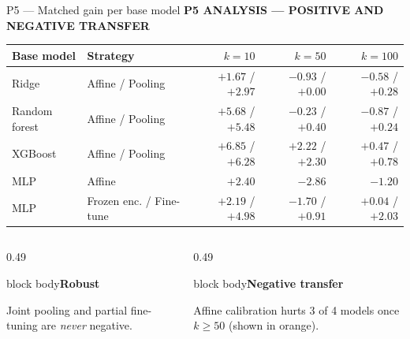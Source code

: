 \documentclass[aspectratio=169,11pt]{beamer}
\newcommand{\sectiontag}[1]{{\footnotesize\usebeamercolor[fg]{structure}\textbf{#1}}\par\vspace{0.10cm}}
\newcommand{\factbox}[2]{\begin{beamercolorbox}[sep=0.13cm,wd=\linewidth]{block body}{\bfseries #1}\par\small #2\end{beamercolorbox}}
\begin{document}
\begin{frame}{P5 — Matched gain per base model}
\sectiontag{P5 \quad ANALYSIS — POSITIVE AND NEGATIVE TRANSFER}
{\footnotesize
\setlength{\tabcolsep}{6pt}
\renewcommand{\arraystretch}{1.22}
\begin{tabular}{@{}llrrr@{}}\toprule
\textbf{Base model} & \textbf{Strategy} & \textbf{$k=10$} & \textbf{$k=50$} & \textbf{$k=100$}\\\midrule
Ridge & Affine / Pooling & $+1.67$ / $+2.97$ & \textcolor{warn}{$-0.93$} / $+0.00$ & \textcolor{warn}{$-0.58$} / $+0.28$\\
Random forest & Affine / Pooling & $+5.68$ / $+5.48$ & \textcolor{warn}{$-0.23$} / $+0.40$ & \textcolor{warn}{$-0.87$} / $+0.24$\\
XGBoost & Affine / Pooling & $\mathbf{+6.85}$ / $+6.28$ & $+2.22$ / $+2.30$ & $+0.47$ / $+0.78$\\
MLP & Affine & $+2.40$ & \textcolor{warn}{$-2.86$} & \textcolor{warn}{$-1.20$}\\
MLP & Frozen enc. / Fine-tune & $+2.19$ / $+4.98$ & \textcolor{warn}{$-1.70$} / $+0.91$ & $+0.04$ / $+2.03$\\
\bottomrule\end{tabular}}
\vspace{0.2cm}
\begin{columns}[T,totalwidth=\textwidth]
\begin{column}{0.49\textwidth}
\factbox{Robust}{Joint pooling and partial fine-tuning are \emph{never} negative.}
\end{column}
\begin{column}{0.49\textwidth}
\factbox{Negative transfer}{Affine calibration hurts 3 of 4 models once $k\ge50$ (shown in orange).}
\end{column}
\end{columns}
\end{frame}



\fi
\end{document}
